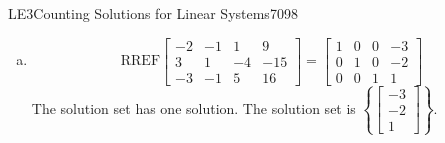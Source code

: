 \begin{exercise}{LE3}{Counting Solutions for Linear Systems}{7098}
\begin{exerciseAnswer}
\begin{enumerate}[(a)]
 
\item  

 \[\mathrm{RREF}\left[\begin{array}{ccc|c}
-2 & -1 & 1 & 9 \\
3 & 1 & -4 & -15 \\
-3 & -1 & 5 & 16
\end{array}\right]=\left[\begin{array}{ccc|c}
1 & 0 & 0 & -3 \\
0 & 1 & 0 & -2 \\
0 & 0 & 1 & 1
\end{array}\right]\] The solution set has one solution. The solution set is \(\left\{ \left[\begin{array}{c}
-3 \\
-2 \\
1
\end{array}\right] \right\}\). 

 
\end{enumerate}

     \end{exerciseAnswer}
 \end{exercise}


